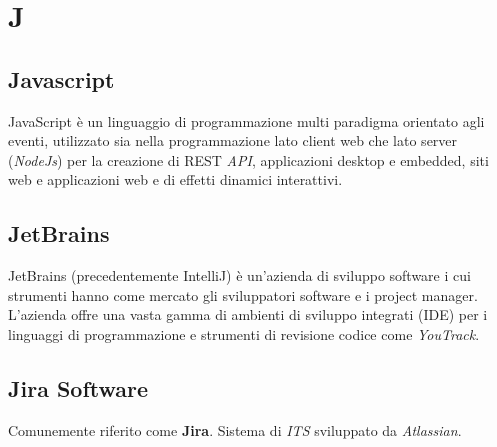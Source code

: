 \chapter{J}

\section{Javascript}
JavaScript è un linguaggio di programmazione multi paradigma orientato agli eventi, utilizzato sia nella programmazione lato client web che lato server (\emph{NodeJs}) per la creazione di REST \emph{API}, applicazioni desktop e embedded, siti web e applicazioni web e di effetti dinamici interattivi.

\section{JetBrains}
JetBrains (precedentemente IntelliJ) è un'azienda di sviluppo software i cui strumenti hanno come mercato gli sviluppatori software e i project manager. L'azienda offre una vasta gamma di ambienti di sviluppo integrati (IDE) per i linguaggi di programmazione e strumenti di revisione codice come \emph{YouTrack}. 

\section{Jira Software}
Comunemente riferito come \textbf{Jira}. Sistema di \emph{ITS} sviluppato da \emph{Atlassian}.



